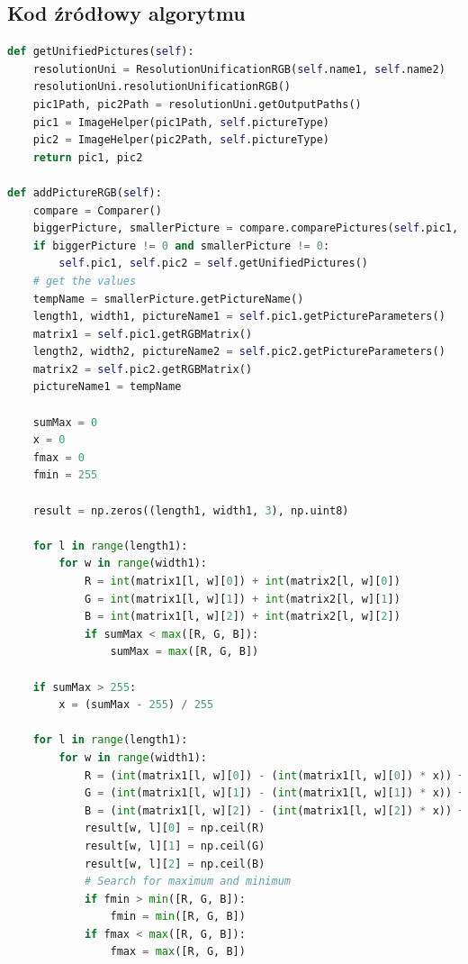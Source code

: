 \documentclass[a4paper,12pt, titlepage]{report}
\begin{document}
\subsection*{Kod źródłowy algorytmu}
\begin{lstlisting}[language=Python]
def getUnifiedPictures(self):
    resolutionUni = ResolutionUnificationRGB(self.name1, self.name2)
    resolutionUni.resolutionUnificationRGB()
    pic1Path, pic2Path = resolutionUni.getOutputPaths()
    pic1 = ImageHelper(pic1Path, self.pictureType)
    pic2 = ImageHelper(pic2Path, self.pictureType)
    return pic1, pic2

def addPictureRGB(self):
    compare = Comparer()
    biggerPicture, smallerPicture = compare.comparePictures(self.pic1, self.pic2)
    if biggerPicture != 0 and smallerPicture != 0:
        self.pic1, self.pic2 = self.getUnifiedPictures()
    # get the values
    tempName = smallerPicture.getPictureName()
    length1, width1, pictureName1 = self.pic1.getPictureParameters()
    matrix1 = self.pic1.getRGBMatrix()
    length2, width2, pictureName2 = self.pic2.getPictureParameters()
    matrix2 = self.pic2.getRGBMatrix()
    pictureName1 = tempName

    sumMax = 0
    x = 0
    fmax = 0
    fmin = 255

    result = np.zeros((length1, width1, 3), np.uint8)

    for l in range(length1):
        for w in range(width1):
            R = int(matrix1[l, w][0]) + int(matrix2[l, w][0])
            G = int(matrix1[l, w][1]) + int(matrix2[l, w][1])
            B = int(matrix1[l, w][2]) + int(matrix2[l, w][2])
            if sumMax < max([R, G, B]):
                sumMax = max([R, G, B])

    if sumMax > 255:
        x = (sumMax - 255) / 255

    for l in range(length1):
        for w in range(width1):
            R = (int(matrix1[l, w][0]) - (int(matrix1[l, w][0]) * x)) + (int(matrix2[l, w][0]) - (int(matrix2[l, w][0]) * x))
            G = (int(matrix1[l, w][1]) - (int(matrix1[l, w][1]) * x)) + (int(matrix2[l, w][1]) - (int(matrix2[l, w][1]) * x))
            B = (int(matrix1[l, w][2]) - (int(matrix1[l, w][2]) * x)) + (int(matrix2[l, w][2]) - (int(matrix2[l, w][2]) * x))
            result[w, l][0] = np.ceil(R)
            result[w, l][1] = np.ceil(G)
            result[w, l][2] = np.ceil(B)
            # Search for maximum and minimum
            if fmin > min([R, G, B]):
                fmin = min([R, G, B])
            if fmax < max([R, G, B]):
                fmax = max([R, G, B])


\end{lstlisting}
\end{document}
